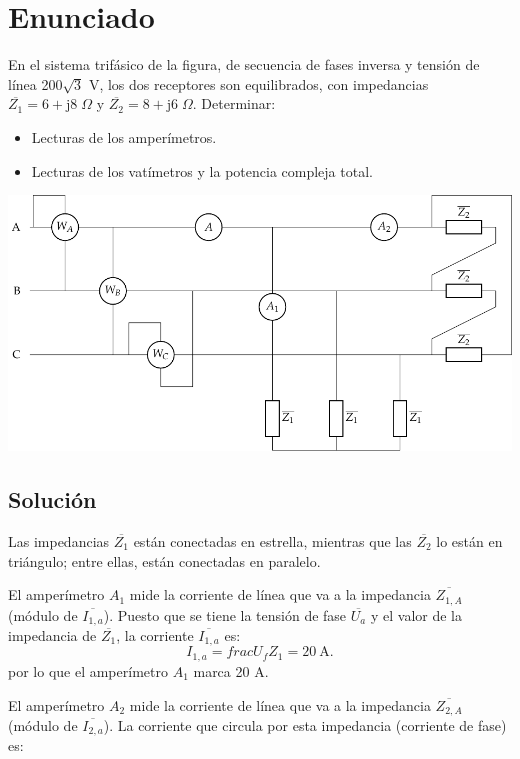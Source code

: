 
\section{Enunciado}
 
En el sistema trifásico de la figura, de secuencia de fases inversa y tensión de línea 200$\sqrt{3}$ V, los dos receptores son equilibrados, con impedancias $\overline{Z_1} = 6+\mathrm{j}8\;\Omega$ y $\overline{Z_2} = 8+\mathrm{j}6\;\Omega$. Determinar:
\begin{itemize}
    \item  Lecturas de los amperímetros.
    \item  Lecturas de los vatímetros y la potencia compleja total.
\end{itemize}
\begin{center}
  \includegraphics[width=.8\linewidth]{figuras/ej5_BT3.pdf}
\end{center}

\subsection*{Solución}
Las impedancias $\overline{Z_1}$ están conectadas en estrella, mientras que las $\overline{Z_2}$ lo están en triángulo; entre ellas, están conectadas en paralelo. 

El amperímetro $A_1$ mide la corriente de línea que va a la impedancia $\overline{Z_{1,A}}$ (módulo de $\overline{I_{1,a}}$). Puesto que se tiene la tensión de fase $\overline{U_{a}}$ y el valor de la impedancia de $\overline{Z_1}$, la corriente $\overline{I_{1,a}}$ es:
\begin{equation*}
    I_{1,a} = frac{U_f}{Z_1} = \qty{20}{\ampere}.
\end{equation*}
por lo que el amperímetro $A_1$ marca 20 A. 

El amperímetro $A_2$ mide la corriente de línea que va a la impedancia $\overline{Z_{2,A}}$ (módulo de $\overline{I_{2,a}}$). La corriente que circula por esta impedancia (corriente de fase) es:

